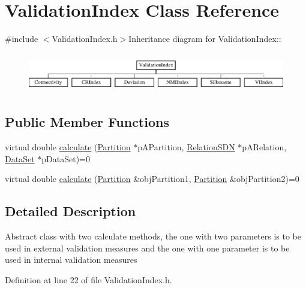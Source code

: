 \hypertarget{classValidationIndex}{
\section{ValidationIndex Class Reference}
\label{classValidationIndex}
}


{\ttfamily \#include $<$ValidationIndex.h$>$}Inheritance diagram for ValidationIndex::\begin{figure}[H]
\begin{center}
\leavevmode
\includegraphics[height=1.76101cm]{classValidationIndex}
\end{center}
\end{figure}
\subsection*{Public Member Functions}
\begin{DoxyCompactItemize}
\item 
virtual double \hyperlink{classValidationIndex_a26fe1244f3313bd7f557149f6846fe01}{calculate} (\hyperlink{classPartition}{Partition} $\ast$pAPartition, \hyperlink{classRelationSDN}{RelationSDN} $\ast$pARelation, \hyperlink{classDataSet}{DataSet} $\ast$pDataSet)=0
\item 
virtual double \hyperlink{classValidationIndex_a8b688d8d53fbdacec393730fe2bab614}{calculate} (\hyperlink{classPartition}{Partition} \&objPartition1, \hyperlink{classPartition}{Partition} \&objPartition2)=0
\end{DoxyCompactItemize}


\subsection{Detailed Description}
Abstract class with two calculate methods, the one with two parameters is to be used in external validation measures and the one with one parameter is to be used in internal validation measures 

Definition at line 22 of file ValidationIndex.h.

